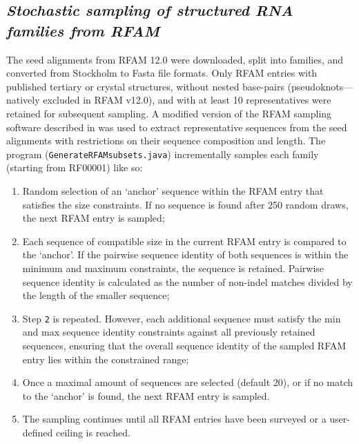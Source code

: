 \documentclass[a4paper,twoside]{article}
\begin{document}
\subsection{\textit{Stochastic sampling of structured RNA families from RFAM}}
The seed alignments from RFAM 12.0 \cite{nawrocki2014rfam} were downloaded, split into families, and converted from Stockholm
to Fasta file formats. Only RFAM entries with published tertiary or crystal structures, without nested base-pairs 
(pseudoknots---natively excluded in RFAM v12.0), and with at least 10 representatives were retained for subsequent sampling. A modified version 
of the RFAM sampling software described in  \cite{smith2013widespread} was used to extract representative 
sequences from the seed alignments with restrictions on their sequence composition and length. The program
(\texttt{GenerateRFAMsubsets.java}) incrementally samples each family (starting from RF00001) like so:

\begin{enumerate}
\item Random selection of an `anchor'  sequence within the RFAM entry that satisfies the size constraints. 
If no sequence is found after 250 random draws, the next RFAM entry is sampled;
\item  Each sequence of compatible size in the current RFAM entry is compared to the `anchor'. 
If the pairwise sequence identity of both sequences is within the minimum and maximum constraints, 
the sequence is retained. Pairwise sequence identity is calculated as the number of non-indel matches 
divided by the length of the smaller sequence; 
\item Step \texttt{2} is repeated. However, each  additional sequence must satisfy the min and max sequence 
identity constraints  against all previously retained sequences, ensuring that the overall sequence identity of the sampled 
RFAM entry lies within the constrained range; 
\item Once a maximal amount of sequences are selected (default 20), or if no match to the `anchor' is found, 
the next RFAM entry is sampled. 
\item The sampling continues until all RFAM entries have been surveyed or a user-defined ceiling is reached. 
\end{enumerate}
\end{document}
